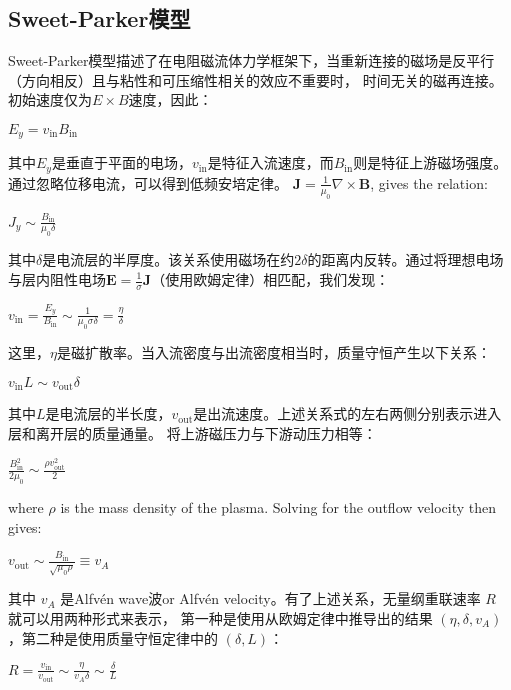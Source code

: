 \documentclass[12pt, a4paper, oneside]{article}
\begin{document}
\begin{spacing}{2.0}
\subsection{Sweet-Parker模型}
Sweet-Parker模型描述了在电阻磁流体力学框架下，当重新连接的磁场是反平行（方向相反）且与粘性和可压缩性相关的效应不重要时，
时间无关的磁再连接。初始速度仅为$E\times B$速度，因此：
\begin{center}
    $\displaystyle E_y = v_\text{in} B_\text{in}$
\end{center}
其中$E_y$是垂直于平面的电场，$v_\text{in}$是特征入流速度，而$B_\text{in}$则是特征上游磁场强度。通过忽略位移电流，可以得到低频安培定律。
$\displaystyle\mathbf{J} = \frac{1}{\mu_0}\nabla\times\mathbf{B}$, gives the relation: 
\begin{center}
    $\displaystyle J_y \sim \frac{B_\text{in}}{\mu_0\delta}$
\end{center}
其中$\delta$是电流层的半厚度。该关系使用磁场在约$2\delta$的距离内反转。通过将理想电场与层内阻性电场$\displaystyle\mathbf{E} = \frac{1}{\sigma}\mathbf{J}$（使用欧姆定律）相匹配，我们发现： 
\begin{center}
    $\displaystyle v_\text{in} = \frac{E_y}{B_\text{in}} \sim \frac{1}{\mu_0\sigma\delta} = \frac{\eta}{\delta}$
\end{center}
这里，$\eta$是磁扩散率。当入流密度与出流密度相当时，质量守恒产生以下关系：\begin{center}
    $\displaystyle v_\text{in}L \sim v_\text{out}\delta$
\end{center}
其中$L$是电流层的半长度，$v_\text{out}$是出流速度。上述关系式的左右两侧分别表示进入层和离开层的质量通量。
将上游磁压力与下游动压力相等：\begin{center}
    $\displaystyle \frac{B_\text{in}^2}{2\mu_0} \sim \frac{\rho v_\text{out}^2}{2}$
\end{center}
where $\rho$ is the mass density of the plasma.  Solving for the outflow velocity then gives: 
\begin{center}
    $\displaystyle v_\text{out} \sim \frac{B_\text{in}}{\sqrt{\mu_0\rho}} \equiv v_A$
\end{center}
其中 $v_A$ 是Alfvén wave波or Alfvén velocity。有了上述关系，无量纲重联速率 $R$ 就可以用两种形式来表示，
第一种是使用从欧姆定律中推导出的结果 $(\eta, \delta, v_A)$，第二种是使用质量守恒定律中的 $(\delta, L)$：
\begin{center}
    $\displaystyle R = \frac{v_\text{in}}{v_\text{out}} \sim \frac{\eta}{v_A\delta} \sim \frac{\delta}{L}$
\end{center}

\end{spacing}
\end{document}
